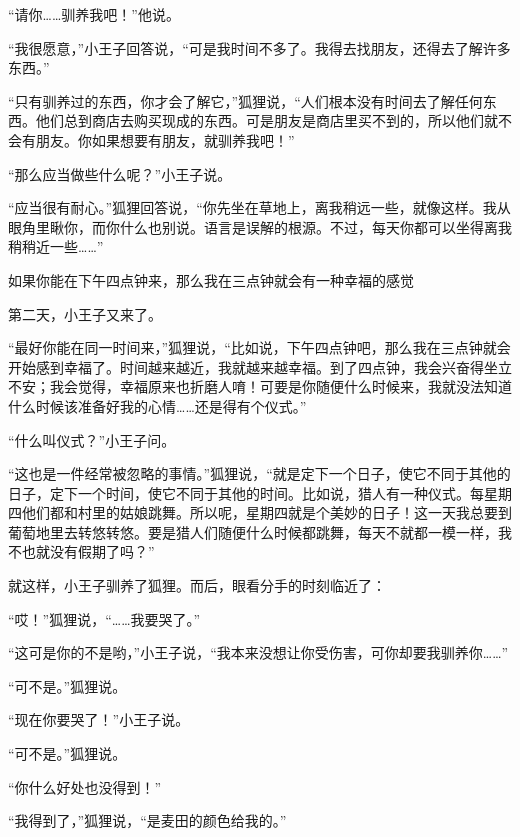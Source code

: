 “请你\ldots{}\ldots{}驯养我吧！”他说。

“我很愿意，”小王子回答说，“可是我时间不多了。我得去找朋友，还得去了解许多东西。”

“只有驯养过的东西，你才会了解它，”狐狸说，“人们根本没有时间去了解任何东西。他们总到商店去购买现成的东西。可是朋友是商店里买不到的，所以他们就不会有朋友。你如果想要有朋友，就驯养我吧！”

“那么应当做些什么呢？”小王子说。

“应当很有耐心。”狐狸回答说，“你先坐在草地上，离我稍远一些，就像这样。我从眼角里瞅你，而你什么也别说。语言是误解的根源。不过，每天你都可以坐得离我稍稍近一些\ldots{}\ldots{}”

{\startalignment[center]
 \stopalignment}

{\startalignment[center]
 \stopalignment}

如果你能在下午四点钟来，那么我在三点钟就会有一种幸福的感觉

第二天，小王子又来了。

“最好你能在同一时间来，”狐狸说，“比如说，下午四点钟吧，那么我在三点钟就会开始感到幸福了。时间越来越近，我就越来越幸福。到了四点钟，我会兴奋得坐立不安；我会觉得，幸福原来也折磨人唷！可要是你随便什么时候来，我就没法知道什么时候该准备好我的心情\ldots{}\ldots{}还是得有个仪式。”

“什么叫仪式？”小王子问。

“这也是一件经常被忽略的事情。”狐狸说，“就是定下一个日子，使它不同于其他的日子，定下一个时间，使它不同于其他的时间。比如说，猎人有一种仪式。每星期四他们都和村里的姑娘跳舞。所以呢，星期四就是个美妙的日子！这一天我总要到葡萄地里去转悠转悠。要是猎人们随便什么时候都跳舞，每天不就都一模一样，我不也就没有假期了吗？”

就这样，小王子驯养了狐狸。而后，眼看分手的时刻临近了：

“哎！”狐狸说，“\ldots{}\ldots{}我要哭了。”

“这可是你的不是哟，”小王子说，“我本来没想让你受伤害，可你却要我驯养你\ldots{}\ldots{}”

“可不是。”狐狸说。

“现在你要哭了！”小王子说。

“可不是。”狐狸说。

“你什么好处也没得到！”

“我得到了，”狐狸说，“是麦田的颜色给我的。”

